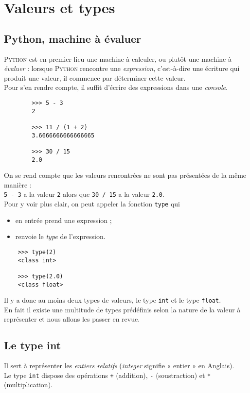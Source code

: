 \chapter{Valeurs et types}
\label{ch:valeurs}
\section{Python, machine à évaluer}
\textsc{Python} est en premier lieu une machine à calculer, ou plutôt une machine à \textit{évaluer} : lorsque \textsc{Python} rencontre une \textit{expression}, c'est-à-dire une écriture qui produit une valeur, il commence par déterminer cette valeur.\\
Pour s'en rendre compte, il suffit d'écrire des expressions dans une \textit{console}.
\begin{pyc}
  \begin{verbatim}
        >>> 5 - 3
        2
        
        >>> 11 / (1 + 2)
        3.6666666666666665

        >>> 30 / 15
        2.0
    \end{verbatim}
\end{pyc}
On se rend compte que les valeurs rencontrées ne sont pas présentées de la même manière :\\ \texttt{5 - 3} a la valeur \texttt{2} alors que \texttt{30 / 15} a la valeur \texttt{2.0}.\\
Pour y voir plus clair, on peut appeler la fonction \texttt{type} qui
\begin{itemize}
  \item en entrée prend une expression ;
  \item renvoie le \textit{type} de l'expression.
\end{itemize}
\begin{pyc}
  \begin{verbatim}
    >>> type(2)
    <class int>

    >>> type(2.0)
    <class float>
  \end{verbatim}
\end{pyc}

Il y a donc au moins deux types de valeurs, le type \texttt{int} et le type \texttt{float}.\\
En fait il existe une multitude de types prédéfinis selon la nature de la valeur à représenter et nous allons les passer en revue.


\section{Le type int}
\label{sec:int}
Il sert à représenter les \textit{entiers relatifs} (\textit{integer} signifie  « entier » en Anglais).\\
Le type \texttt{int} dispose des opérations \texttt{+} (addition), \texttt{-} (soustraction) et \texttt{*} (multiplication).

